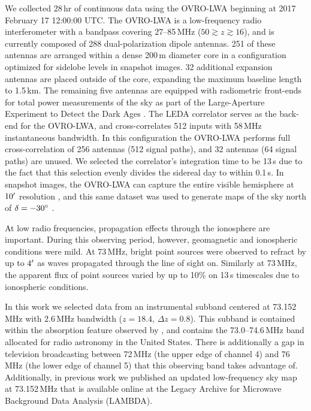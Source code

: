 \documentclass[twocolumn]{aastex62}
\begin{document}
We collected 28\,hr of continuous data using the OVRO-LWA beginning at 2017 February 17 12:00:00
UTC. The OVRO-LWA is a low-frequency radio interferometer with a bandpass covering 27--85\,MHz ($50
\gtrsim z \gtrsim 16$), and is currently composed of 288 dual-polarization dipole antennas.  251 of
these antennas are arranged within a dense 200\,m diameter core in a configuration optimized for
sidelobe levels in snapshot images.  32 additional expansion antennas are placed outside of the
core, expanding the maximum baseline length to 1.5\,km. The remaining five antennas are equipped
with radiometric front-ends for total power measurements of the sky as part of the Large-Aperture
Experiment to Detect the Dark Ages \citep[LEDA;][]{2018MNRAS.478.4193P}.  The LEDA correlator serves
as the back-end for the OVRO-LWA, and cross-correlates 512 inputs with 58\,MHz instantaneous
bandwidth.  In this configuration the OVRO-LWA performs full cross-correlation of 256 antennas (512
signal paths), and 32 antennas (64 signal paths) are unused.  We selected the correlator's
integration time to be 13\,s due to the fact that this selection evenly divides the sidereal day to
within 0.1\,s.  In snapshot images, the OVRO-LWA can capture the entire visible hemisphere at
$10\mbox{$^\prime$}$ resolution \citep[e.g.,][]{2017arXiv171106665A}, and this same dataset was used to
generate maps of the sky north of $\delta=-30\mbox{$^\circ$}$ \citep{2018AJ....156...32E}.

At low radio frequencies, propagation effects through the ionosphere are important.  During this
observing period, however, geomagnetic and ionospheric conditions were mild. At 73\,MHz, bright
point sources were observed to refract by up to $4\mbox{$^\prime$}$ as waves propagated through the line of
sight on. Similarly at 73\,MHz, the apparent flux of point sources varied by up to 10\% on 13\,s
timescales due to ionospheric conditions.

In this work we selected data from an instrumental subband centered at 73.152\,MHz with 2.6\,MHz
bandwidth ($z=18.4$, $\Delta z=0.8$). This subband is contained within the absorption feature
observed by \citet{2018Natur.555...67B}, and contains the 73.0--74.6\,MHz band allocated for radio
astronomy in the United States. There is additionally a gap in television broadcasting between
72\,MHz (the upper edge of channel 4) and 76\,MHz (the lower edge of channel 5) that this observing
band takes advantage of.  Additionally, in previous work we published an updated low-frequency sky
map at 73.152\,MHz \citep{2018AJ....156...32E} that is available online at the Legacy Archive for
Microwave Background Data Analysis (LAMBDA).
\end{document}

